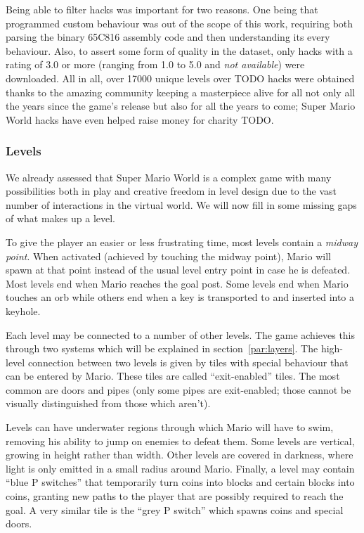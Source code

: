 Being able to filter hacks was important for two reasons. One being
that programmed custom behaviour was out of the scope of this work,
requiring both parsing the binary 65C816 assembly code and then
understanding its every behaviour. Also, to assert some form of
quality in the dataset, only hacks with a rating of 3.0 or more
(ranging from 1.0 to 5.0 and \emph{not available}) were downloaded.
All in all, over 17000 unique levels over TODO hacks were obtained
thanks to the amazing community keeping a masterpiece alive for all
not only all the years since the game's release but also for all the
years to come; Super Mario World hacks have even helped raise money
for charity TODO.

\subsubsection{Levels}

We already assessed that Super Mario World is a complex game with many
possibilities both in play and creative freedom in level design due to
the vast number of interactions in the virtual world. We will now fill
in some missing gaps of what makes up a level.

To give the player an easier or less frustrating time, most levels
contain a \emph{midway point}. When activated (achieved by touching
the midway point), Mario will spawn at that point instead of the usual
level entry point in case he is defeated. Most levels end when Mario
reaches the goal post. Some levels end when Mario touches an orb while
others end when a key is transported to and inserted into a keyhole.

Each level may be connected to a number of other levels. The game
achieves this through two systems which will be explained in
section~\ref{par:layers}. The high-level connection between two levels
is given by tiles with special behaviour that can be entered by Mario.
These tiles are called ``exit-enabled'' tiles. The most common are
doors and pipes (only some pipes are exit-enabled; those cannot be
visually distinguished from those which aren't).

Levels can have underwater regions through which Mario will have to
swim, removing his ability to jump on enemies to defeat them. Some
levels are vertical, growing in height rather than width. Other levels
are covered in darkness, where light is only emitted in a small radius
around Mario. Finally, a level may contain ``blue P switches'' that
temporarily turn coins into blocks and certain blocks into coins,
granting new paths to the player that are possibly required to reach
the goal. A very similar tile is the ``grey P switch'' which spawns
coins and special doors.

